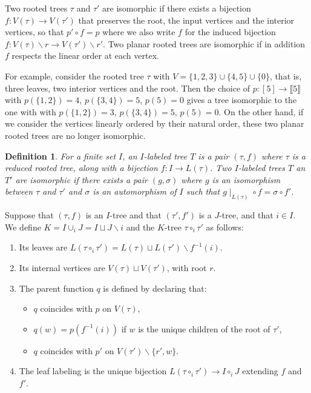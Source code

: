 \documentclass[fleqn, a4paper, twoside]{article}
\newcommand{\0}{\langle 0\rangle}
\newenvironment{tenumerate}{
 \begin{enumerate}
  \setlength{\itemsep}{0pt}
  \setlength{\parskip}{0pt}
}{\end{enumerate}}
\newenvironment{titemize}{
\begin{itemize}
  \setlength{\itemsep}{0pt}
  \setlength{\parskip}{0pt}
}{\end{itemize}}
\DeclareRobustCommand{\[}{\begin{equation}}%
\DeclareRobustCommand{\]}{\end{equation}}%
\theoremstyle{mytheorem}
\theoremstyle{introthm}
\theoremstyle{mydefinition}
\newtheorem{definition}[theorem]{Definition}
\theoremstyle{mydefinition2}
\theoremstyle{plain} %
\newcommand{\?}{\,?\,}
\theoremstyle{mytheorem}
\theoremstyle{plain} %
\begin{document}
Two rooted trees $\tau$ and $\tau'$ are isomorphic
if there exists a bijection $f : V(\tau) \longrightarrow 
V(\tau')$ that preserves the root, the input vertices and the
interior vertices, so that $p'\circ f = p$ where we
also write $f$ for the induced bijection $f : V(\tau)\smallsetminus r \longrightarrow 
V(\tau')\smallsetminus r'$. Two planar rooted trees
are isomorphic if in addition $f$ respects the linear order
at each vertex.

For example, consider the rooted tree $\tau$ with
$V = \{1,2,3\}\cup \{4,5\}\cup \{0\}$, that is,
three leaves, two interior vertices and the root.
Then the choice of $p : [5] \to \llbracket 5 \rrbracket$ 
with $p(\{1,2\}) = 4$, $p(\{3,4\}) = 5$, $p(5) = 0$
gives a tree isomorphic to the one with 
with $p(\{1,2\}) = 3$, $p(\{3,4\}) = 5$, $p(5) = 0$.
On the other hand, if we consider the vertices linearly
ordered by their natural order, these two planar rooted trees 
are no longer isomorphic. 

\begin{definition}
For a finite set $I$, an $I$-labeled tree $T$
is a pair $(\tau,f)$ where $\tau$ is a 
reduced rooted tree, along with
a bijection $f : I \longrightarrow L(\tau)$.
Two $I$-labeled trees $T$ an $T'$ are isomorphic
if there exists a pair $(g,\sigma)$ where
$g$ is an isomorphism between $\tau$ and $\tau'$
and $\sigma$ is an automorphism of $I$ such that
$g\mid_{L(\tau)}\circ f = \sigma\circ f'$. 
\end{definition}

Suppose that $(\tau,f)$ is an $I$-tree and that
$(\tau',f')$ is a $J$-tree, and that $i\in I$. We define
$K=I\cup_i J = I\sqcup J \smallsetminus i$ and the
$K$-tree $\tau\circ_i \tau'$ as follows:
\begin{tenumerate}
\item Its leaves are $L(\tau\circ_i \tau') = L(\tau)\sqcup L(\tau')\smallsetminus f^{-1}(i)$.
\item Its internal vertices are $V(\tau)\sqcup V(\tau')$, with
root $r$. 
\item The parent function $q$ is defined by declaring that:
	\begin{titemize} 
	\item $q$ coincides with $p$ on $V(\tau)$, 
	\item $q(w) = p(f^{-1}(i))$ if
$w$ is the unique children of the root of $\tau'$, 
	\item  $q$
coincides with $p'$ on $V(\tau')\smallsetminus \{r',w\}$.
\end{titemize}
\item The leaf labeling is the unique bijection $L(\tau\circ_i \tau') \longrightarrow I\circ_i J$ extending $f$ and $f'$.
\end{tenumerate} 
\end{document}
